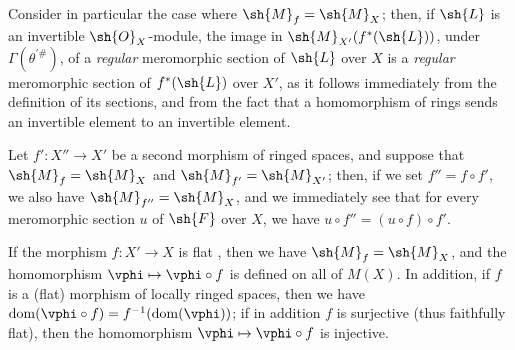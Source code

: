 \begin{env}[20.1.11]
Consider in particular the case where $\sh{M}_f=\sh{M}_X$;
then, if $\sh{L}$ is an invertible $\sh{O}_X$-module, the image in $\sh{M}_{X'}(f^*(\sh{L}))$, under $\Gamma(\theta^{\prime\#})$, of a \emph{regular} meromorphic section of $\sh{L}$ over $X$  is a \emph{regular} meromorphic section of $f^*(\sh{L})$ over $X'$, as it follows immediately from the definition of its sections, and from the fact that a homomorphism of rings sends an invertible element to an invertible element.

Let $f':X''\to X'$ be a second morphism of ringed spaces, and suppose that $\sh{M}_f=\sh{M}_X$ and $\sh{M}_{f'}=\sh{M}_{X'}$;
then, if we set $f''=f\circ f'$, we also have $\sh{M}_{f''}=\sh{M}_X$, and we immediately see that for every meromorphic section $u$ of $\sh{F}$ over $X$, we have $u\circ f''=(u\circ f)\circ f'$.
\end{env}

\begin{proposition}[20.1.12]
\label{IV.20.1.12}
If the morphism $f:X'\to X$ is flat , then we have $\sh{M}_f=\sh{M}_X$, and the homomorphism $\vphi\mapsto\vphi\circ f$ is defined on all of $M(X)$.
In addition, if $f$ is a (flat) morphism of locally ringed spaces, then we have $\operatorname{dom}(\vphi\circ f)=f^{-1}(\operatorname{dom}(\vphi))$;
if in addition $f$ is surjective (thus faithfully flat), then the homomorphism $\vphi\mapsto\vphi\circ f$ is injective.
\end{proposition}

